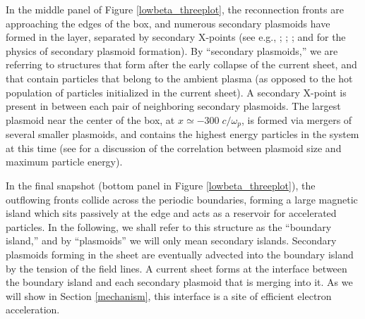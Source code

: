 In the middle panel of Figure \ref{lowbeta_threeplot}, the reconnection fronts are approaching the edges of the box, and numerous secondary plasmoids have formed in the layer, separated by secondary X-points (see e.g., \citealt{loureiro2007}; \citealt{uzdensky2010}; \citealt{huang2012}; \citealt{takamoto2013} and \citealt{comisso2016} for the physics of secondary plasmoid formation).  By ``secondary plasmoids,'' we are referring to structures that form after the early collapse of the current sheet, and that contain particles that belong to the ambient plasma (as opposed to the hot population of particles initialized in the current sheet). A secondary X-point is present in between each pair of neighboring secondary plasmoids. 
The largest plasmoid near the center of the box, at $x\simeq-300 \; c/\omega_{p}$, is formed via mergers of several smaller plasmoids, and contains the highest energy particles in the system at this time (see \citealt{sironi2016} for a discussion of the correlation between plasmoid size and  maximum particle energy).  

In the final snapshot (bottom panel in Figure \ref{lowbeta_threeplot}), the outflowing fronts collide across the periodic boundaries, forming a large magnetic island which sits passively at the edge and acts as a reservoir for accelerated particles. In the following, we shall refer to this structure as the ``boundary island,'' and by ``plasmoids'' we will only mean secondary islands. Secondary plasmoids forming in the sheet are eventually advected into the boundary island by the  tension of the field lines.   A current sheet forms at the interface between the boundary island and each secondary plasmoid that is merging into it. As we will show in Section \ref{mechanism}, this interface is a site of efficient electron acceleration.





